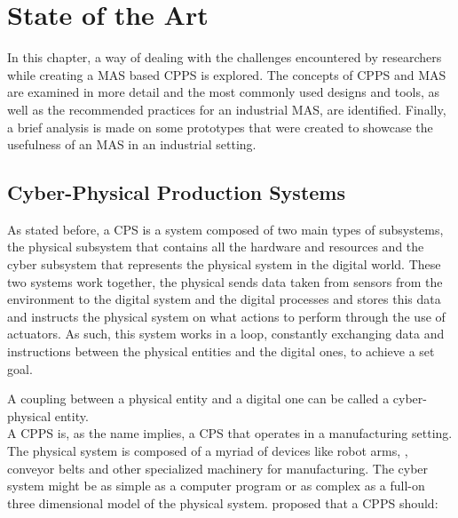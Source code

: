 


\glsresetall

\chapter{State of the Art}
\label{cha:state-of-the-art}

In this chapter, a way of dealing with the challenges encountered by researchers while creating a \acrlong{MAS} based \acrlong{CPPS} is explored. The concepts of \acrshort{CPPS} and \acrshort{MAS} are examined in more detail and the most commonly used designs and tools, as well as the recommended practices for an industrial \acrshort{MAS}, are identified. Finally, a brief analysis is made on some prototypes that were created to showcase the usefulness of an \acrshort{MAS} in an industrial setting.\\

\section{Cyber-Physical Production Systems}
\label{sec:cyber-physical_production_systems}

As stated before, a \acrlong{CPS} is a system composed of two main types of subsystems, the physical subsystem that contains all the hardware and resources and the cyber subsystem that represents the physical system in the digital world. These two systems work together, the physical sends data taken from sensors from the environment to the digital system and the digital processes and stores this data and instructs the physical system on what actions to perform through the use of actuators. As such, this system works in a loop, constantly exchanging data and instructions between the physical entities and the digital ones, to achieve a set goal.

A coupling between a physical entity and a digital one can be called a cyber-physical entity.\\

A \acrlong{CPPS} is, as the name implies, a \acrlong{CPS} that operates in a manufacturing setting. The physical system is composed of a myriad of devices like robot arms, , conveyor belts and other specialized machinery for manufacturing. The cyber system might be as simple as a computer program or as complex as a full-on three dimensional model of the physical system. \citeauthor{birgit01} \cite{birgit01} proposed that a \acrshort{CPPS} should:\\\\

